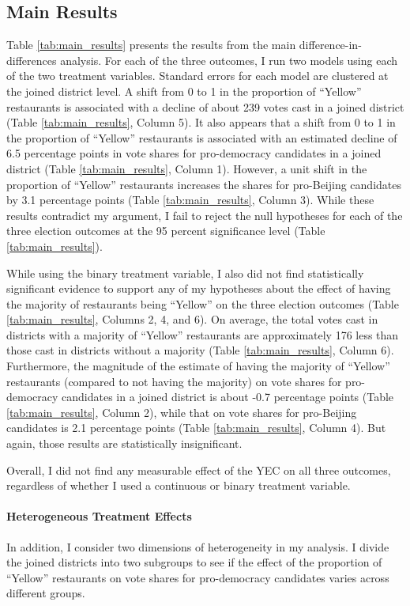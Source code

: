 \documentclass[letterpaper, 12pt]{article}
\begin{document}
\subsection{Main Results} \label{text:section5.1}
Table \ref{tab:main_results} presents the results from the main difference-in-differences analysis. For each of the three outcomes, I run two models using each of the two treatment variables. Standard errors for each model are clustered at the joined district level. A shift from 0 to 1 in the proportion of ``Yellow'' restaurants is associated with a decline of about 239 votes cast in a joined district (Table \ref{tab:main_results}, Column 5). It also appears that a shift from 0 to 1 in the proportion of ``Yellow'' restaurants is associated with an estimated decline of 6.5 percentage points in vote shares for pro-democracy candidates in a joined district (Table \ref{tab:main_results}, Column 1). However, a unit shift in the proportion of ``Yellow'' restaurants increases the shares for pro-Beijing candidates by 3.1 percentage points (Table \ref{tab:main_results}, Column 3). While these results contradict my argument, I fail to reject the null hypotheses for each of the three election outcomes at the 95 percent significance level (Table \ref{tab:main_results}). 

While using the binary treatment variable, I also did not find statistically significant evidence to support any of my hypotheses about the effect of having the majority of restaurants being ``Yellow'' on the three election outcomes (Table \ref{tab:main_results}, Columns 2, 4, and 6). On average, the total votes cast in districts with a majority of ``Yellow'' restaurants are approximately 176 less than those cast in districts without a majority (Table \ref{tab:main_results}, Column 6). Furthermore, the magnitude of the estimate of having the majority of ``Yellow'' restaurants (compared to not having the majority) on vote shares for pro-democracy candidates in a joined district is about -0.7 percentage points (Table \ref{tab:main_results}, Column 2), while that on vote shares for pro-Beijing candidates is 2.1 percentage points (Table \ref{tab:main_results}, Column 4). But again, those results are statistically insignificant.

Overall, I did not find any measurable effect of the YEC on all three outcomes, regardless of whether I used a continuous or binary treatment variable. 




\paragraph*{Heterogeneous Treatment Effects } 
In addition, I consider two dimensions of heterogeneity in my analysis. I divide the joined districts into two subgroups to see if the effect of the proportion of ``Yellow'' restaurants on vote shares for pro-democracy candidates varies across different groups. 
\end{document}
